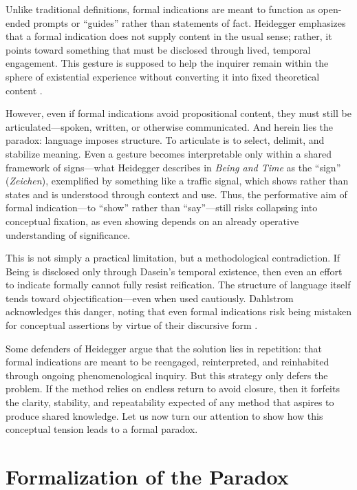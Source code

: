 \documentclass{article}
\begin{document}
Unlike traditional definitions, formal indications are meant to function as open-ended prompts or “guides” rather than statements of fact. Heidegger emphasizes that a formal indication does not supply content in the usual sense; rather, it points toward something that must be disclosed through lived, temporal engagement. This gesture is supposed to help the inquirer remain within the sphere of existential experience without converting it into fixed theoretical content \parencite[pp.~781–783]{dahlstrom1994}.

However, even if formal indications avoid propositional content, they must still be articulated—spoken, written, or otherwise communicated. And herein lies the paradox: language imposes structure. To articulate is to select, delimit, and stabilize meaning. Even a gesture becomes interpretable only within a shared framework of signs---what Heidegger describes in \textit{Being and Time} as the ``sign'' (\textit{Zeichen}), exemplified by something like a traffic signal, which shows rather than states and is understood through context and use. Thus, the performative aim of formal indication---to ``show'' rather than ``say''---still risks collapsing into conceptual fixation, as even showing depends on an already operative understanding of significance.\parencite[§17]{heidegger1962}

This is not simply a practical limitation, but a methodological contradiction. If Being is disclosed only through Dasein’s temporal existence, then even an effort to indicate formally cannot fully resist reification. The structure of language itself tends toward objectification—even when used cautiously. Dahlstrom acknowledges this danger, noting that even formal indications risk being mistaken for conceptual assertions by virtue of their discursive form \parencite[p.~783]{dahlstrom1994}.

Some defenders of Heidegger argue that the solution lies in repetition: that formal indications are meant to be reengaged, reinterpreted, and reinhabited through ongoing phenomenological inquiry. But this strategy only defers the problem. If the method relies on endless return to avoid closure, then it forfeits the clarity, stability, and repeatability expected of any method that aspires to produce shared knowledge. Let us now turn our attention to show how this conceptual tension leads to a formal paradox.

\section*{Formalization of the Paradox}
\end{document}
